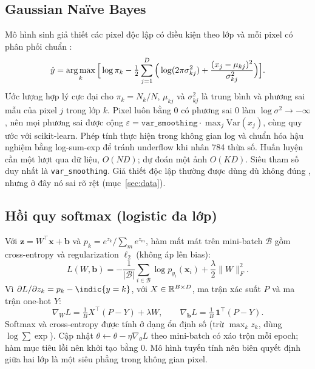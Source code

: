\subsection{Gaussian Naïve Bayes}
\label{sec:nb}
Mô hình sinh giả thiết các pixel độc lập có điều kiện theo lớp và mỗi pixel có phân phối chuẩn \citep{duda2001,bishop2006}:
\begin{equation}
\hat y=\operatorname*{arg\,max}_k\Big[\log\pi_k-\tfrac12\sum_{j=1}^{D}\Big(\log(2\pi\sigma_{kj}^2)+\frac{(x_j-\mu_{kj})^2}{\sigma_{kj}^2}\Big)\Big].
\label{eq:nb}
\end{equation}
Ước lượng hợp lý cực đại cho $\pi_k=N_k/N$, $\mu_{kj}$ và $\sigma^2_{kj}$ là trung bình và phương sai mẫu của pixel $j$ trong lớp $k$. Pixel luôn bằng 0 có phương sai 0 làm $\log\sigma^2\to-\infty$, nên mọi phương sai được cộng $\varepsilon=\texttt{var\_smoothing}\cdot\max_j\mathrm{Var}(x_j)$, cùng quy ước với scikit-learn. Phép tính thực hiện trong không gian log và chuẩn hóa hậu nghiệm bằng log-sum-exp để tránh underflow khi nhân 784 thừa số. Huấn luyện cần một lượt qua dữ liệu, $O(ND)$; dự đoán một ảnh $O(KD)$. Siêu tham số duy nhất là \texttt{var\_smoothing}. Giả thiết độc lập thường được dùng dù không đúng \citep{domingos1997}, nhưng ở đây nó sai rõ rệt (mục~\ref{sec:data}).

\subsection{Hồi quy softmax (logistic đa lớp)}
\label{sec:softmax}
Với $\bm z=W^{\top}\bm x+\bm b$ và $p_k=e^{z_k}/\sum_m e^{z_m}$, hàm mất mát trên mini-batch $\mathcal B$ gồm cross-entropy và regularization $\ell_2$ (không áp lên bias):
\begin{equation}
L(W,\bm b)=-\frac1{|\mathcal B|}\sum_{i\in\mathcal B}\log p_{y_i}(\bm x_i)+\frac{\lambda}{2}\lVert W\rVert_F^2 .
\end{equation}
Vì $\partial L/\partial z_k=p_k-\indic{y=k}$, với $X\in\mathbb{R}^{B\times D}$, ma trận xác suất $P$ và ma trận one-hot $Y$:
\begin{equation}
\nabla_{W}L=\tfrac1B X^{\top}(P-Y)+\lambda W,\qquad \nabla_{\bm b}L=\tfrac1B\,\bm 1^{\top}(P-Y).
\label{eq:softmax-grad}
\end{equation}
Softmax và cross-entropy được tính ở dạng ổn định số (trừ $\max_k z_k$, dùng $\log\sum\exp$). Cập nhật $\theta\leftarrow\theta-\eta\nabla_\theta L$ theo mini-batch có xáo trộn mỗi epoch; hàm mục tiêu lồi nên khởi tạo bằng 0. Mô hình tuyến tính nên biên quyết định giữa hai lớp là một siêu phẳng trong không gian pixel.

